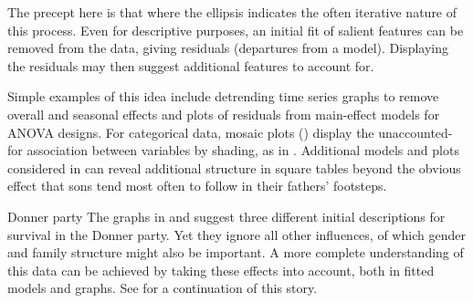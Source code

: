 \documentclass[11pt]{book}
\begin{document}
The precept here is that
where the ellipsis indicates the often iterative nature of this process.
Even for descriptive purposes, an initial fit of salient features can be
removed from the data, giving residuals (departures from a model).
Displaying the residuals may then suggest additional features to account for.

Simple examples of this idea include detrending time series graphs to remove
overall and seasonal effects and plots of residuals from main-effect models
for ANOVA designs.  For categorical data, mosaic plots ()
display the unaccounted-for association between variables by shading, 
as in .  Additional models and plots
considered in  can reveal additional structure
in square tables beyond the obvious effect that sons tend most often to
follow in their fathers' footsteps.

\begin{Example}[donner0a]{Donner party}
The graphs in  and 
suggest three different initial descriptions for survival in the
Donner party.  Yet they ignore all other influences, of which
gender and family structure might also be important.
A more complete understanding of this data can be achieved
by taking these effects into account, both in fitted models
and graphs.  See  for a continuation of this story.
\end{Example}
\end{document}
